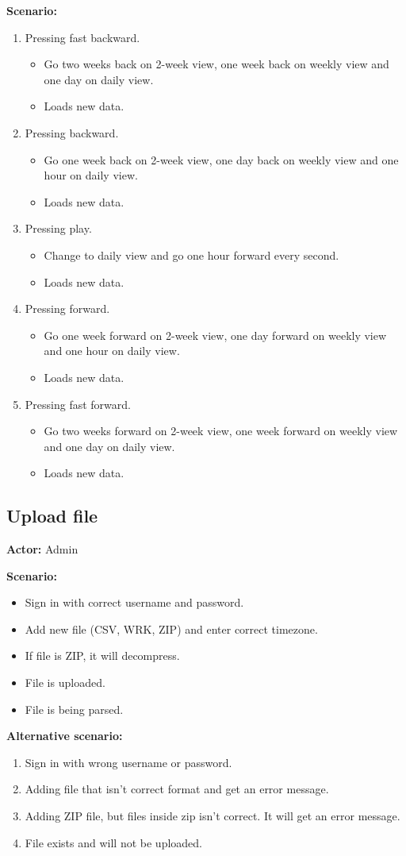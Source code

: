 \textbf{Scenario:}
\begin{enumerate}
\item Pressing fast backward.
\begin{itemize}
\item Go two weeks back on 2-week view, one week back on weekly view and one day on daily view.
\item Loads new data.
\end{itemize}
\item Pressing backward.
\begin{itemize}
\item Go one week back on 2-week view, one day back on weekly view and one hour on daily view.
\item Loads new data.
\end{itemize}
\item Pressing play.
\begin{itemize}
\item Change to daily view and go one hour forward every second.
\item Loads new data.
\end{itemize}
\item Pressing forward.
\begin{itemize}
\item Go one week forward on 2-week view, one day forward on weekly view and one hour on daily view.
\item Loads new data.
\end{itemize}
\item Pressing fast forward.
\begin{itemize}
\item Go two weeks forward on 2-week view, one week forward on weekly view and one day on daily view.
\item Loads new data.
\end{itemize}
\end{enumerate}

\subsection{Upload file}
\textbf{Actor:} Admin

\textbf{Scenario:}
\begin{itemize}
\item Sign in with correct username and password.
\item Add new file (CSV, WRK, ZIP) and enter correct timezone.
\item If file is ZIP, it will decompress.
\item File is uploaded.
\item File is being parsed.
\end{itemize}
\textbf{Alternative scenario:} 
\begin{enumerate}
\item Sign in with wrong username or password.
\item Adding file that isn't correct format and get an error message.
\item Adding ZIP file, but files inside zip isn't correct. It will get an error message.
\item File exists and will not be uploaded.
\end{enumerate}